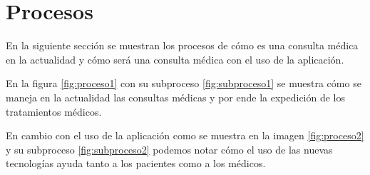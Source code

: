 


	
	


\section{Procesos}

En la siguiente sección se muestran los procesos de cómo es una consulta médica en la actualidad y cómo será una consulta médica con el uso de la aplicación.


En la figura \ref{fig:proceso1} con su subproceso \ref{fig:subproceso1} se muestra cómo se maneja en la actualidad las consultas médicas y por ende la expedición de los tratamientos médicos.

En cambio con el uso de la aplicación como se muestra en la imagen \ref{fig:proceso2} y su subproceso \ref{fig:subproceso2} podemos notar cómo el uso de las nuevas tecnologías ayuda tanto a los pacientes como a los médicos.


